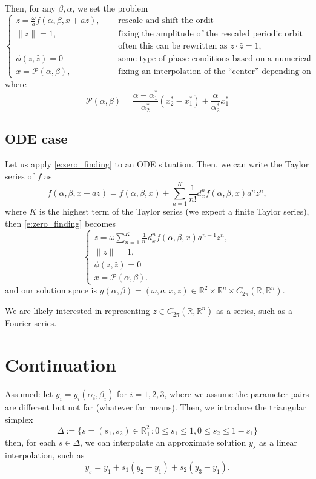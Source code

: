 \documentclass[10pt]{article}
\begin{document}
Then, for any $\beta, \alpha$, we set the problem
\begin{equation}\label{e:zero_finding}
\begin{cases}
\dot z = \frac{\omega}{a} f(\alpha, \beta, x + az),\quad &\text{ rescale and shift the ordit}\\
\| z\| = 1, \quad&\text{ fixing the amplitude of the rescaled periodic orbit}\\
& \text{ often this can be rewritten as } z\cdot \hat z = 1,\\
\phi(z, \hat z) = 0 &\text{ some type of phase conditions based on a numerical solution}\\
x = \mathcal{P}(\alpha,\beta), \quad &\text{ fixing an interpolation of the ``center'' depending on the parameters}
\end{cases}
\end{equation}
where
$$
\mathcal{P}(\alpha,\beta) = \frac{\alpha - \alpha_1^*}{\alpha^*_2} (x_2^*-x_1^*) + \frac{\alpha}{\alpha_2^*} x_1^*
$$



\subsection{ODE case}
Let us apply \eqref{e:zero_finding} to an ODE situation. Then, we can write the Taylor series of $f$ as
$$
f(\alpha, \beta, x+az) = f(\alpha, \beta, x) + \sum_{n=1}^K \frac{1}{n!} d^n_xf(\alpha, \beta, x) a^n z^n,
$$
where $K$ is the highest term of the Taylor series (we expect a finite Taylor series), then \eqref{e:zero_finding} becomes
\begin{equation}\label{e:better_zero_finding}
\begin{cases}
\dot z = \omega\sum_{n=1}^K\frac{1}{n!} d^n_xf(\alpha, \beta, x) a^{n-1} z^n,\\
\| z\| = 1, \\
\phi(z, \hat z) = 0\\
x = \mathcal{P}(\alpha,\beta).
\end{cases}
\end{equation}
and our solution space is $y(\alpha, \beta) = ( \omega, a, x, z) \in \mathbb{R}^2 \times \mathbb{R}^n \times C_{2\pi}(\mathbb{R},\mathbb{R}^n)$.

We are likely interested in representing  $z\in C_{2\pi}(\mathbb{R},\mathbb{R}^n)$ as a series, such as a Fourier series.


\section{Continuation}
Assumed: let $y_i=y_i(\alpha_i, \beta_i)$ for $i=1, 2, 3$, where we assume the parameter pairs are different but not far (whatever far means). Then, we introduce the triangular simplex
$$
\Delta := \{ s= (s_1, s_2) \in \mathbb{R}^2_+: 0\leq s_1\leq 1, 0\leq s_2 \leq 1-s_1\}
$$
then, for each  $s\in\Delta$, we can interpolate an approximate solution $y_s$ as a linear interpolation, such as
$$
y_s =  y_1 + s_1(y_2-y_1) + s_2(y_3-y_1).
$$
\end{document}
